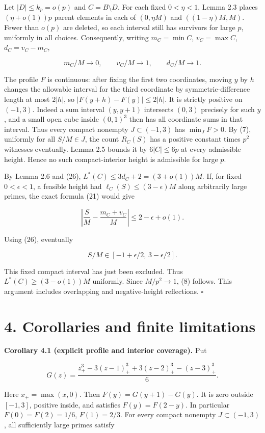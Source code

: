 \documentclass[11pt,a4paper]{article}
\begin{document}
Let \(|D|\le k_p=o(p)\) and \(C=B\setminus D\). For each fixed \(0<\eta<1\), Lemma 2.3 places \((\eta+o(1))p\) parent elements in each of \((0,\eta M)\) and \(((1-\eta)M,M)\). Fewer than \(o(p)\) are deleted, so each interval still has survivors for large \(p\), uniformly in all choices. Consequently, writing \(m_C=\min C\), \(v_C=\max C\), \(d_C=v_C-m_C\),

\[m_C/M\to0,\qquad v_C/M\to1,\qquad d_C/M\to1.
\tag{26}\]

The profile \(F\) is continuous: after fixing the first two coordinates, moving \(y\) by \(h\) changes the allowable interval for the third coordinate by symmetric-difference length at most \(2|h|\), so \(|F(y+h)-F(y)|\le2|h|\). It is strictly positive on \((-1,3)\). Indeed a sum interval \((y,y+1)\) intersects \((0,3)\) precisely for such \(y\), and a small open cube inside \((0,1)^3\) then has all coordinate sums in that interval. Thus every compact nonempty \(J\subset(-1,3)\) has \(\min_J F>0\). By (7), uniformly for all \(S/M\in J\), the count \(R_C(S)\) has a positive constant times \(p^2\) witnesses eventually. Lemma 2.5 bounds it by \(6|C|\le6p\) at every admissible height. Hence no such compact-interior height is admissible for large \(p\).

By Lemma 2.6 and (26), \(L^*(C)\le3d_C+2=(3+o(1))M\). If, for fixed \(0<\epsilon<1\), a feasible height had \(\ell_C(S)\le(3-\epsilon)M\) along arbitrarily large primes, the exact formula (21) would give

\[\left|\frac S M-\frac{m_C+v_C}{M}\right|
\le2-\epsilon+o(1).\]

Using (26), eventually

\[S/M\in[-1+\epsilon/2,\,3-\epsilon/2].\]

This fixed compact interval has just been excluded. Thus \(L^*(C)\ge(3-o(1))M\) uniformly. Since \(M/p^2\to1\), (8) follows. This argument includes overlapping and negative-height reflections. \hfill\(\square\)

\section{4. Corollaries and finite limitations}\label{corollaries-and-finite-limitations}

\textbf{Corollary 4.1 (explicit profile and interior coverage).} Put

\[G(z)=\frac{z_+^3-3(z-1)_+^3+3(z-2)_+^3-(z-3)_+^3}{6}.\]

Here \(x_+=\max(x,0)\). Then \(F(y)=G(y+1)-G(y)\). It is zero outside \([-1,3]\), positive inside, and satisfies \(F(y)=F(2-y)\). In particular \(F(0)=F(2)=1/6\), \(F(1)=2/3\). For every compact nonempty \(J\subset(-1,3)\), all sufficiently large primes satisfy
\end{document}
